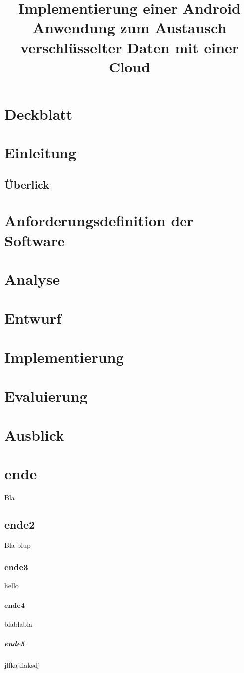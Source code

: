 \documentclass[11pt, a4paper]{scrreprt}
\title{Implementierung einer Android Anwendung zum Austausch verschlüsselter Daten mit einer Cloud}
\begin{document}
\titlepage
\maketitle
\tableofcontents

\part{Deckblatt}

\part{Einleitung}
\chapter{Überlick}

\part{Anforderungsdefinition der Software}

\part{Analyse}

\part{Entwurf}

\part{Implementierung}

\part{Evaluierung}

\part{Ausblick}

\part{ende}
Bla
\chapter{ende2}
Bla blup
\section{ende3}
hello
\subsection{ende4}
blablabla
\subsubsection{ende5}
jlfkajflaksdj
\end{document}
